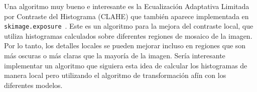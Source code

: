 Una algoritmo muy bueno e interesante es la Ecualización Adaptativa Limitada por Contraste del Histograma (CLAHE) que tambi\'en aparece implementada en \verb|skimage.exposure|~\cite{module_exposure}. Este es un algoritmo para la mejora del contraste local, que utiliza histogramas calculados sobre diferentes regiones de mosaico de la imagen. Por lo tanto, los detalles locales se pueden mejorar incluso en regiones que son más oscuras o más claras que la mayoría de la imagen. Ser\'ia interesante implementar un algoritmo que siguiera esta idea de calcular los histogramas de manera local pero utilizando el algoritmo de transformaci\'on af\'in con los diferentes modelos.